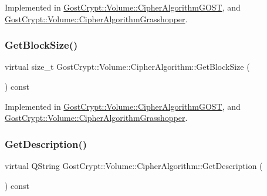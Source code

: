 Implemented in \hyperlink{class_gost_crypt_1_1_volume_1_1_cipher_algorithm_g_o_s_t_a6cc2c22a2d097e24468a3004381df911}{Gost\+Crypt\+::\+Volume\+::\+Cipher\+Algorithm\+G\+O\+ST}, and \hyperlink{class_gost_crypt_1_1_volume_1_1_cipher_algorithm_grasshopper_addae3b81a7a30d4379f1874ca694b0a8}{Gost\+Crypt\+::\+Volume\+::\+Cipher\+Algorithm\+Grasshopper}.

\mbox{\label{class_gost_crypt_1_1_volume_1_1_cipher_algorithm_acea94097c86d12a5e5c7bbee613526a2}} 
\subsubsection{\texorpdfstring{Get\+Block\+Size()}{GetBlockSize()}}
{\footnotesize\ttfamily virtual size\+\_\+t Gost\+Crypt\+::\+Volume\+::\+Cipher\+Algorithm\+::\+Get\+Block\+Size (\begin{DoxyParamCaption}{ }\end{DoxyParamCaption}) const\hspace{0.3cm}{\ttfamily [pure virtual]}}



Implemented in \hyperlink{class_gost_crypt_1_1_volume_1_1_cipher_algorithm_g_o_s_t_a2a0bb62cd68fd772b6bf8558b6d138a9}{Gost\+Crypt\+::\+Volume\+::\+Cipher\+Algorithm\+G\+O\+ST}, and \hyperlink{class_gost_crypt_1_1_volume_1_1_cipher_algorithm_grasshopper_a31f8600b20a03dbb9b0b6715b38cd570}{Gost\+Crypt\+::\+Volume\+::\+Cipher\+Algorithm\+Grasshopper}.

\mbox{\label{class_gost_crypt_1_1_volume_1_1_cipher_algorithm_a01b18f6950161fa518115bf08db3a997}} 
\subsubsection{\texorpdfstring{Get\+Description()}{GetDescription()}}
{\footnotesize\ttfamily virtual Q\+String Gost\+Crypt\+::\+Volume\+::\+Cipher\+Algorithm\+::\+Get\+Description (\begin{DoxyParamCaption}{ }\end{DoxyParamCaption}) const\hspace{0.3cm}{\ttfamily [pure virtual]}}



